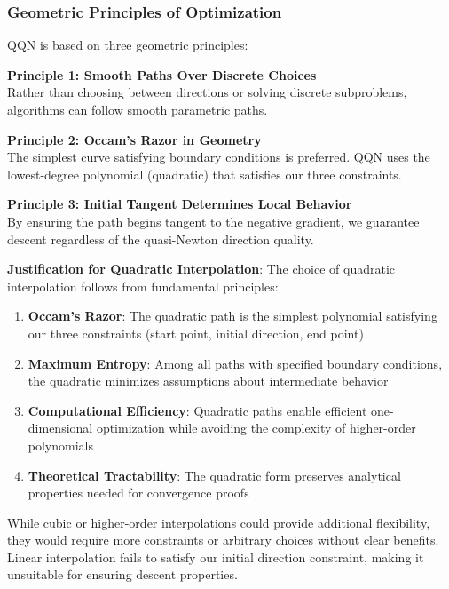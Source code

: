 \hypertarget{geometric-principles-of-optimization}{%
\subsubsection{Geometric Principles of Optimization}\label{geometric-principles-of-optimization}}

QQN is based on three geometric principles:

\textbf{Principle 1: Smooth Paths Over Discrete Choices}\\
Rather than choosing between directions or solving discrete subproblems, algorithms can follow smooth parametric paths.

\textbf{Principle 2: Occam's Razor in Geometry}\\
The simplest curve satisfying boundary conditions is preferred. QQN uses the lowest-degree polynomial (quadratic) that satisfies our three constraints.

\textbf{Principle 3: Initial Tangent Determines Local Behavior}\\
By ensuring the path begins tangent to the negative gradient, we guarantee descent regardless of the quasi-Newton direction quality.

\textbf{Justification for Quadratic Interpolation}: The choice of quadratic interpolation follows from fundamental principles:

\begin{enumerate}
\def\labelenumi{\arabic{enumi}.}
\tightlist
\item
  \textbf{Occam's Razor}: The quadratic path is the simplest polynomial satisfying our three constraints (start point, initial direction, end point)
\item
  \textbf{Maximum Entropy}: Among all paths with specified boundary conditions, the quadratic minimizes assumptions about intermediate behavior
\item
  \textbf{Computational Efficiency}: Quadratic paths enable efficient one-dimensional optimization while avoiding the complexity of higher-order polynomials
\item
  \textbf{Theoretical Tractability}: The quadratic form preserves analytical properties needed for convergence proofs
\end{enumerate}

While cubic or higher-order interpolations could provide additional flexibility, they would require more constraints or arbitrary choices without clear benefits.
Linear interpolation fails to satisfy our initial direction constraint, making it unsuitable for ensuring descent properties.


